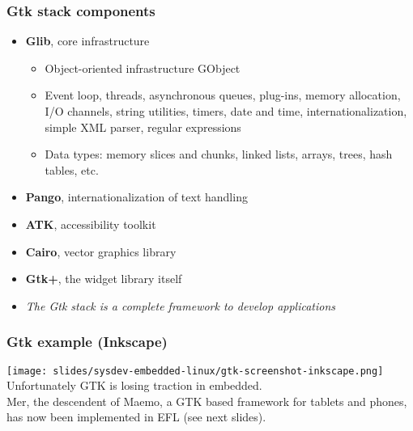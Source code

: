 \begin{frame}
  \frametitle{Gtk stack components}
  \begin{itemize}
  \item {\bf Glib}, core infrastructure
    \begin{itemize}
    \item Object-oriented infrastructure GObject
    \item Event loop, threads, asynchronous queues, plug-ins, memory
      allocation, I/O channels, string utilities, timers, date and
      time, internationalization, simple XML parser, regular
      expressions
    \item Data types: memory slices and chunks, linked lists, arrays,
      trees, hash tables, etc.
    \end{itemize}
  \item {\bf Pango}, internationalization of text handling
  \item {\bf ATK}, accessibility toolkit
  \item {\bf Cairo}, vector graphics library
  \item {\bf Gtk+}, the widget library itself
  \item {\em The Gtk stack is a complete framework to develop applications}
  \end{itemize}
\end{frame}

\begin{frame}
  \frametitle{Gtk example (Inkscape)}
    \texttt{[image: slides/sysdev-embedded-linux/gtk-screenshot-inkscape.png]}\\
    Unfortunately GTK is losing traction in embedded.\\
    Mer, the descendent of Maemo, a GTK based framework for tablets and
    phones, has now been implemented in EFL (see next slides).\\
\end{frame}

